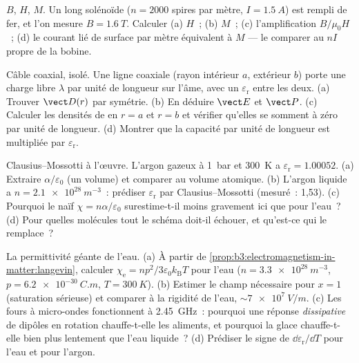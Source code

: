 \begin{exercise}[$\star$]\label{exo:b3:electromagnetism-in-matter:4}
$B$, $H$, $M$. Un long solénoïde ($n = \num{2000}$ spires par mètre,
$I = \qty{1.5}{A}$) est rempli de fer, et l'on mesure
$B = \qty{1.6}{T}$. Calculer (a) $H$~; (b) $M$~; (c) l'amplification
$B/\mu_0H$~; (d) le courant lié de surface par mètre équivalent à
$M$ --- le comparer au $nI$ propre de la bobine.
\end{exercise}

\begin{exercise}[$\star\star$]\label{exo:b3:electromagnetism-in-matter:5}
Câble coaxial, isolé. Une ligne coaxiale (rayon intérieur $a$,
extérieur $b$) porte une charge libre $\lambda$ par unité de longueur
sur l'âme, avec un  $\varepsilon_{\text{r}}$ entre les
deux. (a) Trouver $\vect D(r)$ par symétrie. (b) En déduire $\vect E$
et $\vect P$. (c) Calculer les densités de  en $r = a$ et
$r = b$ et vérifier qu'elles se somment à zéro par unité de longueur.
(d) Montrer que la capacité par unité de longueur est multipliée par
$\varepsilon_{\text{r}}$.
\end{exercise}

\begin{exercise}[$\star\star$]\label{exo:b3:electromagnetism-in-matter:6}
Clausius--Mossotti à l'œuvre. L'argon gazeux à \qty{1}{bar} et
\qty{300}{K} a $\varepsilon_{\text{r}} = 1.00052$. (a) Extraire
$\alpha/\varepsilon_0$ (un volume) et comparer au volume atomique.
(b) L'argon liquide a $n = \qty{2.1e28}{m^{-3}}$~: prédiser
$\varepsilon_{\text{r}}$ par Clausius--Mossotti (mesuré~: 1,53).
(c) Pourquoi le naïf $\chi = n\alpha/\varepsilon_0$ surestime-t-il
moins gravement ici que pour l'eau~? (d) Pour quelles molécules tout
le schéma doit-il échouer, et qu'est-ce qui le remplace~?
\end{exercise}

\begin{exercise}[$\star\star$]\label{exo:b3:electromagnetism-in-matter:7}
La permittivité géante de l'eau. (a) À partir de
\cref{prop:b3:electromagnetism-in-matter:langevin}, calculer
$\chi_{\text{e}} = np^2/3\varepsilon_0k_{\text{B}}T$ pour l'eau
($n = \qty{3.3e28}{m^{-3}}$, $p = \qty{6.2e-30}{C.m}$,
$T = \qty{300}{K}$). (b) Estimer le champ nécessaire pour $x = 1$
(saturation sérieuse) et comparer à la rigidité  de l'eau,
$\sim\qty{7e7}{V/m}$. (c) Les fours à micro-ondes fonctionnent à
\qty{2.45}{GHz}~: pourquoi une réponse \emph{dissipative} de dipôles
en rotation chauffe-t-elle les aliments, et pourquoi la glace
chauffe-t-elle bien plus lentement que l'eau liquide~? (d) Prédiser le
signe de $\dd\varepsilon_{\text{r}}/\dd T$ pour l'eau et pour
l'argon.
\end{exercise}

